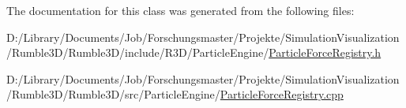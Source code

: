 The documentation for this class was generated from the following files\+:\begin{DoxyCompactItemize}
\item 
D\+:/\+Library/\+Documents/\+Job/\+Forschungsmaster/\+Projekte/\+Simulation\+Visualization/\+Rumble3\+D/\+Rumble3\+D/include/\+R3\+D/\+Particle\+Engine/\mbox{\hyperlink{_particle_force_registry_8h}{Particle\+Force\+Registry.\+h}}\item 
D\+:/\+Library/\+Documents/\+Job/\+Forschungsmaster/\+Projekte/\+Simulation\+Visualization/\+Rumble3\+D/\+Rumble3\+D/src/\+Particle\+Engine/\mbox{\hyperlink{_particle_force_registry_8cpp}{Particle\+Force\+Registry.\+cpp}}\end{DoxyCompactItemize}
